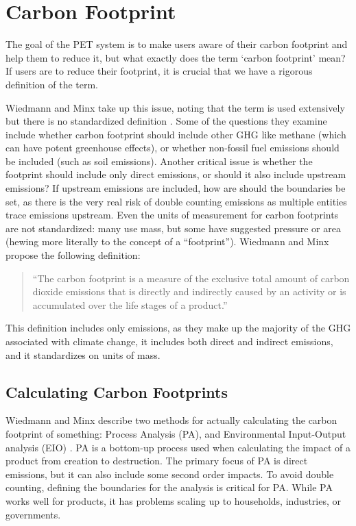 \section{Carbon Footprint}

The goal of the PET system is to make users aware of their carbon footprint and help them to reduce it, but what exactly does the term `carbon footprint' mean? If users are to reduce their footprint, it is crucial that we have a rigorous definition of the term.

Wiedmann and Minx take up this issue, noting that the term is used extensively but there is no standardized definition \cite{Wiedmann2007carbon-footprint}. Some of the questions they examine include whether carbon footprint should include other GHG like methane (which can have potent greenhouse effects), or whether non-fossil fuel emissions should be included (such as soil emissions). Another critical issue is whether the footprint should include only direct emissions, or should it also include upstream emissions? If upstream emissions are included, how are should the boundaries be set, as there is the very real risk of double counting emissions as multiple entities trace emissions upstream. Even the units of measurement for carbon footprints are not standardized: many use mass, but some have suggested pressure or area (hewing more literally to the concept of a ``footprint''). Wiedmann and Minx propose the following definition:

\begin{quote}
``The carbon footprint is a measure of the exclusive total amount of carbon dioxide emissions that is directly and indirectly caused by an activity or is accumulated over the life stages of a product.''
\end{quote}

This definition includes only \COtwo emissions, as they make up the majority of the GHG associated with climate change, it includes both direct and indirect emissions, and it standardizes on units of mass.

\subsection{Calculating Carbon Footprints}

Wiedmann and Minx describe two methods for actually calculating the carbon footprint of something: Process Analysis (PA), and Environmental Input-Output analysis (EIO) \cite{Wiedmann2007carbon-footprint}. PA is a bottom-up process used when calculating the impact of a product from creation to destruction. The primary focus of PA is direct emissions, but it can also include some second order impacts. To avoid double counting, defining the boundaries for the analysis is critical for PA. While PA works well for products, it has problems scaling up to households, industries, or governments. 

